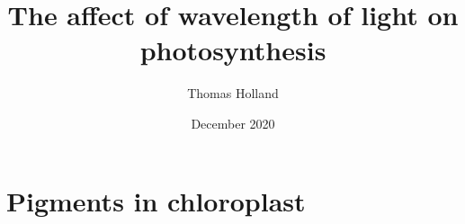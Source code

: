 \documentclass[11pt]{article}
\title{The affect of wavelength of light on photosynthesis}
\author{Thomas Holland}
\date{December 2020}
\begin{document}
\maketitle
\tableofcontents

\section{Pigments in chloroplast}



\end{document}
